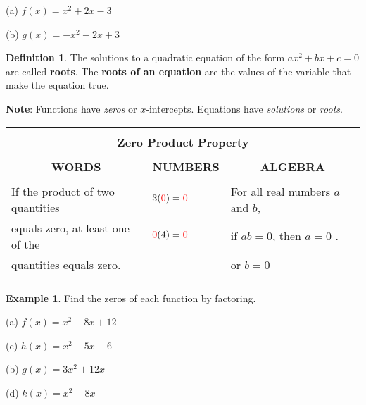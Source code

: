 \documentclass{report}
\theoremstyle{definition}
\newtheorem{example}{\bf Example}
\newtheorem{definition}{\bf Definition}[section]
\begin{document}
\begin{minipage}[t]{0.45\linewidth}
(a) $f(x)=x^2+2x-3$
\end{minipage}
\hfill
\begin{minipage}[t]{0.45\linewidth}
(b) $g(x)=-x^2-2x+3$
\end{minipage}

\vspace{2cm}

\begin{definition}
The solutions to a quadratic equation of the form $ax^2+bx+c=0$ are called \textbf{roots}. The \textbf{roots of an equation} are the values of the variable that make the equation true.
\end{definition}

\noindent \textbf{Note}: Functions have \emph{zeros} or $x$-intercepts. Equations have \emph{solutions} or \emph{roots}.


\begin{center}
	\begin{tabular}{|l|l|l|}
		\hline
		\multicolumn{3}{|l|}{}\\
		\multicolumn{3}{|c|}{\large\textbf{Zero Product Property} \normalsize}\\
		\hline
		&&\\
		\multicolumn{1}{|c|}{\textbf{WORDS}}&\multicolumn{1}{c|}{\textbf{NUMBERS}}&\multicolumn{1}{c|}{\textbf{ALGEBRA}}\\
		\hline
		&&\\
		If the product of two quantities& $3(\color{red}0\color{black}) = \color{red}0\color{black}$& For all real numbers $a$ and $b$,\\
		equals zero, at least one of the& $\color{red}0\color{black}(4) = \color{red}0\color{black}$& if $ab=0$, then $a=0$ .\\
		quantities equals zero.&&or $b=0$\\
		&&\\
		\hline
	\end{tabular}
\end{center}


\begin{example}
Find the zeros of each function by factoring.
\end{example}

\begin{minipage}[t]{0.45\linewidth}
(a) $f(x)=x^2-8x+12$
\vspace{3cm}

(c) $h(x)=x^2-5x-6$
\end{minipage}
\hfill
\begin{minipage}[t]{0.45\linewidth}
(b) $g(x)=3x^2+12x$
\vspace{3cm}

(d) $k(x)=x^2-8x$
\end{minipage}
\end{document}

